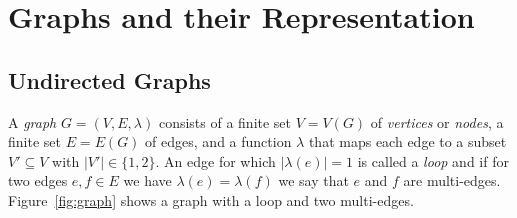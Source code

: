 \documentclass[runningheads]{cl2emult}
\begin{document}
\section{Graphs and their Representation}\label{sec:basics}
%
\newcommand{\D}{\mathcal{D}}
\newcommand{\E}{\mathcal{E}}
\newcommand{\U}{\mathcal{U}}
\def\PP{\mathop{\cal P}}
\def\NP{\mathop{\cal NP}}
\def\order{\mathop{\cal O}}
\def\topnumber{\mathop{\rm topnumber}}
\def\starr{\mathop{\rm star}}
\def\instar{\mathop{\rm instar}}
\def\outstar{\mathop{\rm outstar}}
\def\loopp{\mathop{\rm loop}}
\def\adj{\mathop{\rm adj}}
\def\inadj{\mathop{\rm inadj}}
\def\outadj{\mathop{\rm outadj}}
\def\degg{\mathop{\rm deg}}
\def\maxdeg{\mathop{\rm maxdeg}}
\def\mindeg{\mathop{\rm mindeg}}
\def\indeg{\mathop{\rm indeg}}
\def\outdeg{\mathop{\rm outdeg}}
\def\depth{\mathop{\rm depth}}
\def\roott{\mathop{\rm root}}
\def\parent{\mathop{\rm parent}}
\def\barycenter{\mathop{\rm barycenter}}
\def\median{\mathop{\rm median}}
\def\repulsionforce{\mathop{\rm repulsionforce}}
\def\springforce{\mathop{\rm springforce}}
\def\rotationforce{\mathop{\rm rotationforce}}
\def\gravitationforce{\mathop{\rm gravitationforce}}
\def\R{\mathop{\rm I\kern-1.5pt R}}
\def\N{\mathop{\rm I\kern-1.5pt N}}
\def\argmax{\mathop{\rm argmax}}
%
\subsection{Undirected Graphs}
%
A \emph{graph}
$G=(V,E,\lambda)$ consists of a finite set
$V=V(G)$ of \emph{vertices} or
\emph{nodes}, a finite set $E=E(G)$ of
edges, and a function $\lambda$
that maps each edge to a subset $V'\subseteq V$ with $|V'|\in\{1,2\}$.
An edge for which $|\lambda(e)|=1$ is called a
\emph{loop} and if for two edges $e,f\in E$ we have
$\lambda(e)=\lambda(f)$ we say that $e$ and $f$ are multi-edges.
Figure~\ref{fig:graph} shows a graph with a loop and two multi-edges.

\end{document}
